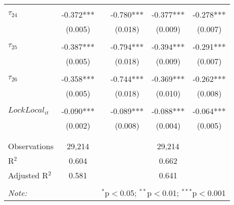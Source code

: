 \begin{tabular}{@{\extracolsep{-5pt}}lccccc}
                &           &&           &           &           \\[-2.1ex]
$\tau_{24}$     & -0.372*** && -0.780*** & -0.377*** & -0.278*** \\
                &  (0.005)  &&  (0.018)  &  (0.009)  &  (0.007)  \\
                &           &&           &           &           \\[-2.1ex]
$\tau_{25}$     & -0.387*** && -0.794*** & -0.394*** & -0.291*** \\
                &  (0.005)  &&  (0.018)  &  (0.009)  &  (0.007)  \\
                &           &&           &           &           \\[-2.1ex]
$\tau_{26}$     & -0.358*** && -0.744*** & -0.369*** & -0.262*** \\
                &  (0.005)  &&  (0.018)  &  (0.010)  &  (0.008)  \\
                &           &&           &           &           \\[-1.ex]
$LockLocal_{it}$ & -0.090*** && -0.089*** & -0.088*** & -0.064*** \\
                &  (0.002)  &&  (0.008)  &  (0.004)  &  (0.005)  \\
                &           &&           &           &           \\[-2.1ex]
\hline \\[-1.8ex] 
Observations     & 29,214 && \multicolumn{3}{c}{29,214} \\ 
R$^{2}$          &  0.604 && \multicolumn{3}{c}{0.662 } \\ 
Adjusted R$^{2}$ &  0.581 && \multicolumn{3}{c}{0.641 } \\ 
\hline 
\hline \\[-1.8ex] 
\textit{Note:}  & \multicolumn{5}{r}{$^{*}$p$<$0.05; $^{**}$p$<$0.01; $^{***}$p$<$0.001} \\ 
\end{tabular} 